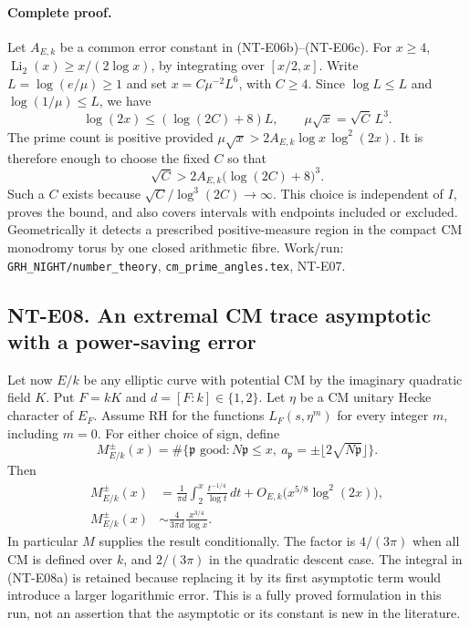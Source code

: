 \paragraph{Complete proof.}
Let $A_{E,k}$ be a common error constant in (NT-E06b)--(NT-E06c).
For $x\ge4$,
$\operatorname{Li}_2(x)\ge x/(2\log x)$, by integrating over $[x/2,x]$.
Write $L=\log(e/\mu)\ge1$ and set $x=C\mu^{-2}L^6$, with $C\ge4$.
Since $\log L\le L$ and $\log(1/\mu)\le L$, we have
\[
 \log(2x)\le(\log(2C)+8)L,\qquad
 \mu\sqrt x=\sqrt C\,L^3.
\]
The prime count is positive provided
$\mu\sqrt x>2A_{E,k}\log x\,\log^2(2x)$.
It is therefore enough to choose the fixed $C$ so that
\[
 \sqrt C>2A_{E,k}\bigl(\log(2C)+8\bigr)^3.
\]
Such a $C$ exists because $\sqrt C/\log^3(2C)\to\infty$.
This choice is independent of $I$, proves the bound, and also covers
intervals with endpoints included or excluded. Geometrically it
detects a prescribed positive-measure region in the compact CM
monodromy torus by one closed arithmetic fibre. Work/run:
\texttt{GRH\_NIGHT/number\_theory}, \texttt{cm\_prime\_angles.tex}, NT-E07.

\subsection*{NT-E08. An extremal CM trace asymptotic with a power-saving error}
Let now $E/k$ be any elliptic curve with potential CM by the imaginary
quadratic field $K$. Put $F=kK$ and $d=[F:k]\in\{1,2\}$. Let $\eta$
be a CM unitary Hecke character of $E_F$. Assume RH for the functions
$L_F(s,\eta^m)$ for every integer $m$, including $m=0$.
For either choice of sign, define
\[
 M^\pm_{E/k}(x)
  =\#\{\mathfrak p\text{ good}:N\mathfrak p\le x,\
               a_{\mathfrak p}=\pm\lfloor2\sqrt{N\mathfrak p}\rfloor\}.
\]
Then
\begin{align}
 M^\pm_{E/k}(x)
   &=\frac1{\pi d}\int_2^x\frac{t^{-1/4}}{\log t}\,dt
       +O_{E,k}\bigl(x^{5/8}\log^2(2x)\bigr),             \tag{NT-E08a}\\
 M^\pm_{E/k}(x)
   &\sim \frac4{3\pi d}\frac{x^{3/4}}{\log x}.
                                                               \tag{NT-E08b}
\end{align}
In particular $M$ supplies the result conditionally. The factor is
$4/(3\pi)$ when all CM is defined over $k$, and $2/(3\pi)$ in the
quadratic descent case. The integral in (NT-E08a) is retained because
replacing it by its first asymptotic term would introduce a larger
logarithmic error. This is a fully proved formulation in this run,
not an assertion that the asymptotic or its constant is new in the
literature.


